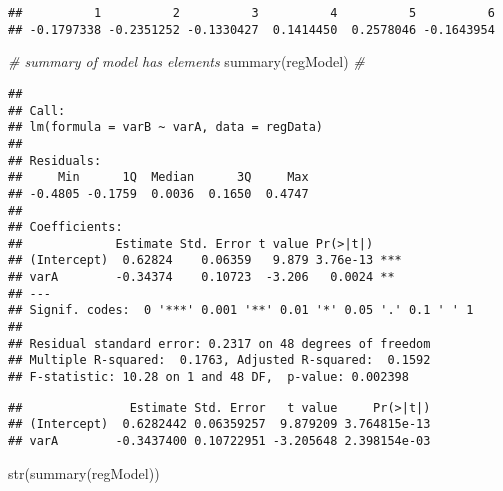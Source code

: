 \documentclass[
]{article}
\newenvironment{Shaded}{\begin{snugshade}}{\end{snugshade}}
\newcommand{\CommentTok}[1]{\textcolor[rgb]{0.56,0.35,0.01}{\textit{#1}}}
\newcommand{\FunctionTok}[1]{\textcolor[rgb]{0.00,0.00,0.00}{#1}}
\newcommand{\NormalTok}[1]{#1}
\newcommand{\SpecialCharTok}[1]{\textcolor[rgb]{0.00,0.00,0.00}{#1}}
\begin{document}
\begin{Shaded}
\end{Shaded}

\begin{verbatim}
##          1          2          3          4          5          6 
## -0.1797338 -0.2351252 -0.1330427  0.1414450  0.2578046 -0.1643954
\end{verbatim}

\begin{Shaded}
\begin{Highlighting}[]
\CommentTok{\# \textquotesingle{}summary\textquotesingle{} of model has elements}
\FunctionTok{summary}\NormalTok{(regModel) }\CommentTok{\#}
\end{Highlighting}
\end{Shaded}

\begin{verbatim}
## 
## Call:
## lm(formula = varB ~ varA, data = regData)
## 
## Residuals:
##     Min      1Q  Median      3Q     Max 
## -0.4805 -0.1759  0.0036  0.1650  0.4747 
## 
## Coefficients:
##             Estimate Std. Error t value Pr(>|t|)    
## (Intercept)  0.62824    0.06359   9.879 3.76e-13 ***
## varA        -0.34374    0.10723  -3.206   0.0024 ** 
## ---
## Signif. codes:  0 '***' 0.001 '**' 0.01 '*' 0.05 '.' 0.1 ' ' 1
## 
## Residual standard error: 0.2317 on 48 degrees of freedom
## Multiple R-squared:  0.1763, Adjusted R-squared:  0.1592 
## F-statistic: 10.28 on 1 and 48 DF,  p-value: 0.002398
\end{verbatim}

\begin{Shaded}
\end{Shaded}

\begin{verbatim}
##               Estimate Std. Error   t value     Pr(>|t|)
## (Intercept)  0.6282442 0.06359257  9.879209 3.764815e-13
## varA        -0.3437400 0.10722951 -3.205648 2.398154e-03
\end{verbatim}

\begin{Shaded}
\begin{Highlighting}[]
\FunctionTok{str}\NormalTok{(}\FunctionTok{summary}\NormalTok{(regModel))}
\end{Highlighting}
\end{Shaded}
\end{document}
